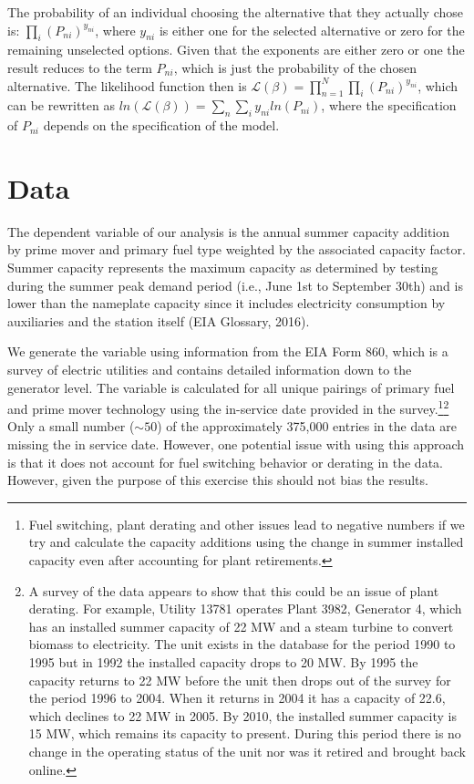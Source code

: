 \documentclass[10pt]{amsart}
\begin{document}
The probability of an individual choosing the alternative that they actually chose is: $\prod_{i} \left(P_{ni}\right)^{y_{ni}}$, where $y_{ni}$ is either one for the selected alternative or zero for the remaining unselected options.
Given that the exponents are either zero or one the result reduces to the term $P_{ni}$, which is just the probability of the chosen alternative. 
The likelihood function then is $\mathcal{L(\beta)} = \prod_{n=1}^N \prod_{i} \left(P_{ni}\right)^{y_{ni}}$, which can be rewritten as $ln(\mathcal{L(\beta)})= \sum_{n} \sum_{i} y_{ni} ln\left(P_{ni}\right)$, where the specification of $P_{ni}$ depends on the specification of the model. 


\section{Data}
The dependent variable of our analysis is the annual summer capacity addition by prime mover and primary fuel type weighted by the associated capacity factor.
Summer capacity represents the maximum capacity as determined by testing during the summer peak demand period (i.e., June 1st to September 30th) and is lower than the nameplate capacity since it includes electricity consumption by auxiliaries and the station itself \parencite{}(EIA Glossary, 2016). 

We generate the variable using information from the EIA Form 860, which is a survey of electric utilities and contains detailed information down to the generator level.
The variable is calculated for all unique pairings of primary fuel and prime mover technology using the in-service date provided in the survey.\footnote{Fuel switching, plant derating and other issues lead to negative numbers if we try and calculate the capacity additions using the change in summer installed capacity even after accounting for plant retirements.}\footnote{A survey of the data appears to show that this could be an issue of plant derating. For example, Utility 13781 operates Plant 3982, Generator 4, which has an installed summer capacity of 22 MW and a steam turbine to convert biomass to electricity. The unit exists in the database for the period 1990 to 1995 but in 1992 the installed capacity drops to 20 MW. By 1995 the capacity returns to 22 MW before the unit then drops out of the survey for the period 1996 to 2004. When it returns in 2004 it has a capacity of 22.6, which declines to 22 MW in 2005. By 2010, the installed summer capacity is 15 MW, which remains its capacity to present. During this period there is no change in the operating status of the unit nor was it retired and brought back online.} 
Only a small number ($\sim 50$) of the approximately 375,000 entries in the data are missing the in service date.
However, one potential issue with using this approach is that it does not account for fuel switching behavior or derating in the data.
However, given the purpose of this exercise this should not bias the results. 
\end{document}
